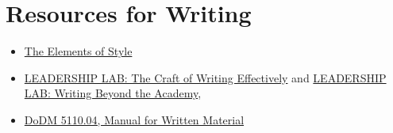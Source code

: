 \section{Resources for Writing\label{sec:resources-for-writing}}

\begin{itemize}
    \item \href{https://en.wikipedia.org/wiki/The_Elements_of_Style}{The Elements of Style}


\item \href{https://www.youtube.com/watch?v=vtIzMaLkCaM}{LEADERSHIP LAB: The Craft of Writing Effectively}
and \href{https://www.youtube.com/watch?v=aFwVf5a3pZM}{LEADERSHIP LAB: Writing Beyond the Academy},

\item \href{https://www.google.com/search?q=dodm+5110.04}{DoDM 5110.04, Manual for Written Material}
\end{itemize}

